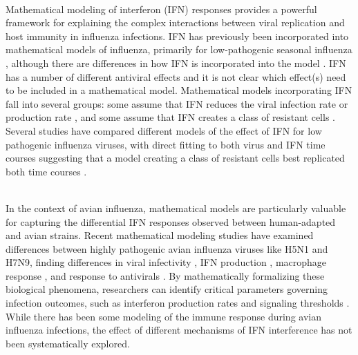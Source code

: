 \documentclass[12pt]{article}
\begin{document}
\noindent \\ Mathematical modeling of interferon (IFN) responses provides a powerful framework for explaining the complex interactions between viral replication and host immunity in influenza infections. IFN has previously been incorporated into mathematical models of influenza, primarily for low-pathogenic seasonal influenza \cite{pawelek12,saenz10,handel10}, although there are differences in how IFN is incorporated into the model  \cite{dobrovolny13}. IFN has a number of different antiviral effects \cite{houglum83, baglioni79, baglioni81,stark98} and it is not clear which effect(s) need to be included in a mathematical model. Mathematical models incorporating IFN fall into several groups: some assume that IFN reduces the viral infection rate \cite{baccam06} or production rate \cite{ackerman22,baccam06,handel10,xie20,price15,li14}, and some assume that IFN creates a class of resistant cells \cite{bocharov94,li23,yan19imm,hagenaars16,abbasi24,hancioglu07,leviyang18,hernandez14,cao15,xie20,srivastava20}. Several studies have compared different models of the effect of IFN \cite{dobrovolny13,saenz10,pawelek12,baccam06} for low pathogenic influenza viruses, with direct fitting to both virus and IFN time courses suggesting that a model creating a class of resistant cells best replicated both time courses \cite{pawelek12}. %

\noindent \\ In the context of avian influenza, mathematical models are particularly valuable for capturing the differential IFN responses observed between human-adapted and avian strains. Recent mathematical modeling studies have examined differences between highly pathogenic avian influenza viruses like H5N1 and H7N9, finding differences in viral infectivity \cite{li23}, IFN production \cite{ackerman22,li23}, macrophage response \cite{pawelek16}, and response to antivirals \cite{dobrovolny11}. By mathematically formalizing these biological phenomena, researchers can identify critical parameters governing infection outcomes, such as interferon production rates and signaling thresholds \cite{xie20,hagenaars16,xie21}. While there has been some modeling of the immune response during avian influenza infections, the effect of different mechanisms of IFN interference has not been systematically explored. %
\end{document}
